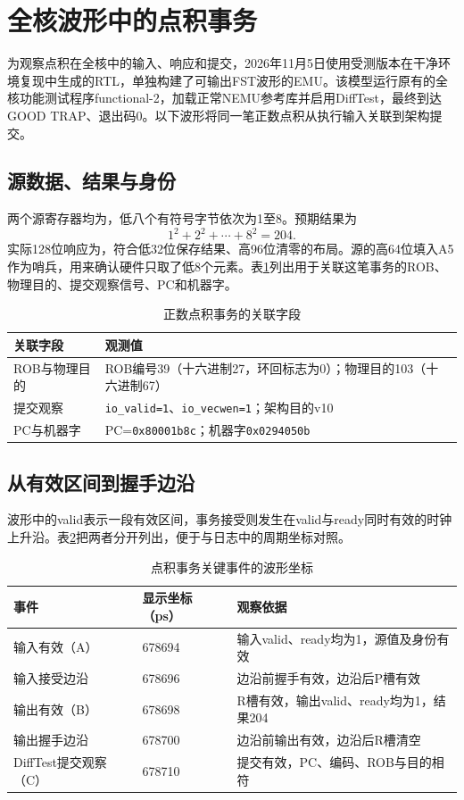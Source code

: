 \section{全核波形中的点积事务}
为观察点积在全核中的输入、响应和提交，2026年11月5日使用受测版本在干净环境复现中生成的RTL，单独构建了可输出FST波形的EMU。该模型运行原有的全核功能测试程序functional-2，加载正常NEMU参考库并启用DiffTest，最终到达GOOD TRAP、退出码0。以下波形将同一笔正数点积从执行输入关联到架构提交。

\subsection{源数据、结果与身份}
两个源寄存器均为，低八个有符号字节依次为1至8。预期结果为
\[
1^2+2^2+\cdots+8^2=204.
\]
实际128位响应为，符合低32位保存结果、高96位清零的布局。源的高64位填入A5作为哨兵，用来确认硬件只取了低8个元素。表\ref{tab:3-wave-identity}列出用于关联这笔事务的ROB、物理目的、提交观察信号、PC和机器字。

\begin{table}[!htbp]\centering\small
\caption{正数点积事务的关联字段}\label{tab:3-wave-identity}
\begin{tabular}{p{.24\linewidth}p{.68\linewidth}}\toprule
关联字段 & 观测值\\\midrule
ROB与物理目的 & ROB编号39（十六进制27，环回标志为0）；物理目的103（十六进制67）\\
提交观察 & \texttt{io\_valid=1}、\texttt{io\_vecwen=1}；架构目的v10\\
PC与机器字 & PC=\texttt{0x80001b8c}；机器字\texttt{0x0294050b}\\
\bottomrule\end{tabular}
\end{table}

\subsection{从有效区间到握手边沿}
波形中的valid表示一段有效区间，事务接受则发生在valid与ready同时有效的时钟上升沿。表\ref{tab:3-wave-events}把两者分开列出，便于与日志中的周期坐标对照。

\begin{table}[!htbp]\centering\small
\caption{点积事务关键事件的波形坐标}\label{tab:3-wave-events}
\begin{tabular}{p{.25\linewidth}p{.17\linewidth}p{.48\linewidth}}\toprule
事件 & 显示坐标（ps） & 观察依据\\\midrule
输入有效（A） & 678694 & 输入valid、ready均为1，源值及身份有效\\
输入接受边沿 & 678696 & 边沿前握手有效，边沿后P槽有效\\
输出有效（B） & 678698 & R槽有效，输出valid、ready均为1，结果204\\
输出握手边沿 & 678700 & 边沿前输出有效，边沿后R槽清空\\
DiffTest提交观察（C） & 678710 & 提交有效，PC、编码、ROB与目的相符\\
\bottomrule\end{tabular}
\end{table}

